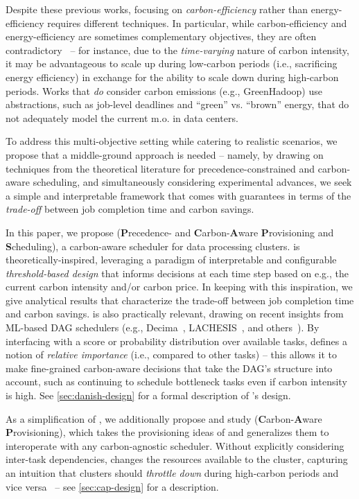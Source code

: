 Despite these previous works, focusing on \textit{carbon-efficiency} rather than energy-efficiency requires different techniques.  In particular, while carbon-efficiency and energy-efficiency are sometimes complementary objectives, they are often contradictory~\cite{Hanafy:23} -- for instance, due to the \textit{time-varying} nature of carbon intensity, it may be advantageous to scale up during low-carbon periods (i.e., sacrificing energy efficiency) in exchange for the ability to scale down during high-carbon periods.
Works that \textit{do} consider carbon emissions (e.g., GreenHadoop) use abstractions, such as job-level deadlines and ``green'' vs. ``brown'' energy, that do not adequately model the current m.o. in data centers.

To address this multi-objective 
setting while catering to realistic scenarios, we propose that a middle-ground approach is needed -- namely, by drawing on techniques from the theoretical literature for precedence-constrained and carbon-aware scheduling, and simultaneously considering experimental advances, we seek a simple and interpretable framework that comes with guarantees in terms of the \textit{trade-off} between job completion time and carbon savings.



In this paper, we propose \PCAPS
(\textbf{P}recedence- and \textbf{C}arbon-\textbf{A}ware \textbf{P}rovisioning and \textbf{S}cheduling), a carbon-aware scheduler for data processing clusters.  \PCAPS is theoretically-inspired, leveraging a paradigm of interpretable and configurable \textit{threshold-based design} that informs decisions at each time step based on e.g., the current carbon intensity and/or carbon price.  In keeping with this inspiration, we give analytical results that characterize the trade-off between job completion time and carbon savings.
\PCAPS is also practically relevant, drawing on recent insights from ML-based DAG schedulers (e.g., Decima~\cite{Hongzi:2019:Decima}, LACHESIS~\cite{Zhou:22}, and others~\cite{Wu:18, Li:23, Grinsztajn:20}).  By interfacing with a score or probability distribution over available tasks, \PCAPS defines a notion of \textit{relative importance} (i.e., compared to other tasks) -- this allows it to make fine-grained carbon-aware decisions that take the DAG's structure into account, such as continuing to schedule bottleneck tasks even if carbon intensity is high.  See \autoref{sec:danish-design} for a formal description of \PCAPS's design.

As a simplification of \PCAPS, we additionally propose and study \CAP (\textbf{C}arbon-\textbf{A}ware \textbf{P}rovisioning), which takes the provisioning ideas of \PCAPS and generalizes them to interoperate with any carbon-agnostic scheduler.  
Without explicitly considering inter-task dependencies, \CAP changes the resources available to the cluster, capturing an intuition that clusters should \textit{throttle down} during high-carbon periods and vice versa~\cite{Hanafy:23:CarbonScaler, radovanovic2022carbon} -- see \autoref{sec:cap-design} for a description.





